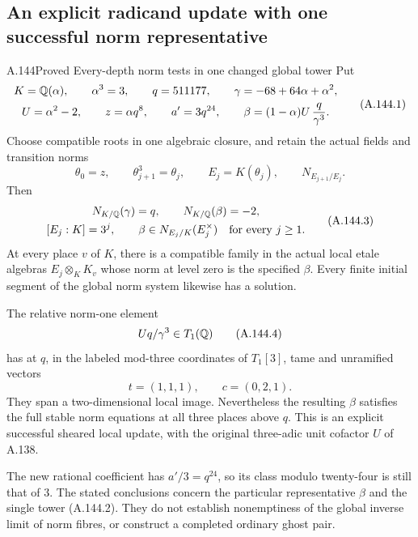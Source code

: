 \subsection{An explicit radicand update with one successful norm representative}

\begin{statement}{A.144}{Proved}
{Every-depth norm tests in one changed global tower}
Put
\[
 \begin{gathered}
 K=\mathbb Q(\alpha),\qquad \alpha^3=3,\qquad
 q=511177,\qquad
 \gamma=-68+64\alpha+\alpha^2,\\
 U=\alpha^2-2,\qquad
 z=\alpha q^8,\qquad a'=3q^{24},\qquad
 \beta=(1-\alpha)U\,\frac{q}{\gamma^3}.
 \end{gathered}
\tag{A.144.1}
\]
Choose compatible roots in one algebraic closure,
and retain the actual fields and transition norms
\[
 \theta_0=z,\qquad \theta_{j+1}^3=\theta_j,\qquad
 E_j=K(\theta_j),\qquad
                       N_{E_{j+1}/E_j}.
\tag{A.144.2}
\]
Then
\[
 \begin{gathered}
 N_{K/\mathbb Q}(\gamma)=q,\qquad N_{K/\mathbb Q}(\beta)=-2,\\
 [E_j:K]=3^j,\qquad
 \beta\in N_{E_j/K}(E_j^\times)\quad\text{for every }j\ge1 .
 \end{gathered}
\tag{A.144.3}
\]
At every place \(v\) of \(K\), there is a compatible
family in the actual local etale algebras
\(E_j\otimes_K K_v\) whose norm at level zero is
the specified \(\beta\).
Every finite initial segment of the global
norm system likewise has a solution.

The relative norm-one element
\[
                         Uq/\gamma^3\in T_1(\mathbb Q)
\tag{A.144.4}
\]
has at \(q\), in the labeled mod-three
coordinates of \(T_1[3]\), tame and unramified
vectors
\[
                  t=(1,1,1),\qquad c=(0,2,1).
\tag{A.144.5}
\]
They span a two-dimensional local image.
Nevertheless the resulting \(\beta\) satisfies
the full stable norm equations at all three
places above \(q\).
This is an explicit successful sheared local
update, with the original three-adic unit
cofactor \(U\) of A.138.

The new rational coefficient has
\(a'/3=q^{24}\), so its class modulo twenty-four
is still that of \(3\).
The stated conclusions concern the particular
representative \(\beta\) and the single tower
(A.144.2).
They do not establish nonemptiness of the
global inverse limit of norm fibres, or
construct a completed ordinary ghost pair.
\end{statement}
